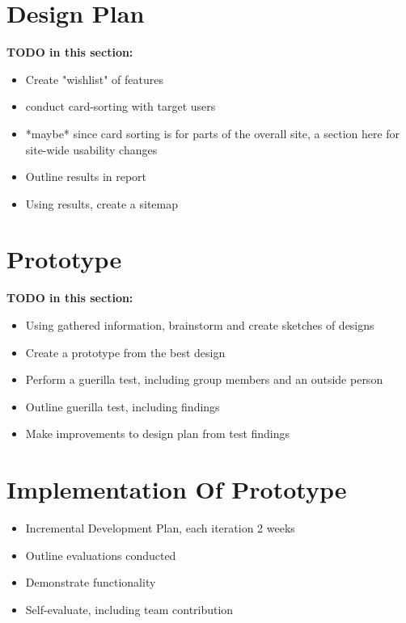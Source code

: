 \documentclass[12pt]{article}
\begin{document}
\section{Design Plan} %

\textbf{TODO in this section:}
\begin{itemize}
    \item Create "wishlist" of features
    \item conduct card-sorting with target users
    \item *maybe* since card sorting is for parts of the overall site, a section here for site-wide usability changes
    \item Outline results in report
    \item Using results, create a sitemap
\end{itemize}

\section[Prototype]{Prototype}

\textbf{TODO in this section:}
\begin{itemize}
    \item Using gathered information, brainstorm and create sketches of designs
    \item Create a prototype from the best design
    \item Perform a guerilla test, including group members and an outside person
    \item Outline guerilla test, including findings
    \item Make improvements to design plan from test findings
\end{itemize}

\section[Implementation]{Implementation Of Prototype}

\begin{itemize}
    \item Incremental Development Plan, each iteration 2 weeks
    \item Outline evaluations conducted
    \item Demonstrate functionality
    \item Self-evaluate, including team contribution
\end{itemize}
\end{document}

